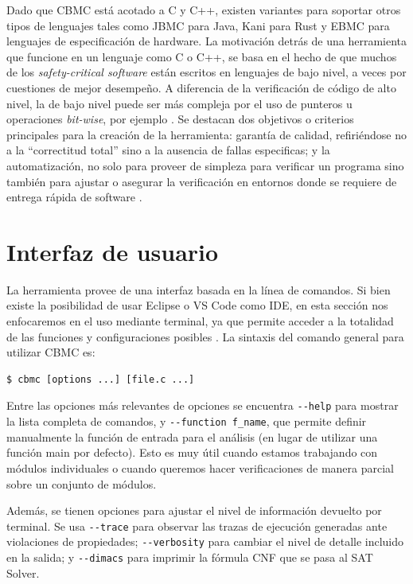 \documentclass[runningheads]{llncs}
\begin{document}
Dado que CBMC está acotado a C y C++, existen variantes para soportar otros tipos de lenguajes tales como JBMC para Java, Kani para Rust y EBMC para 
lenguajes de especificación de hardware.
La motivación detrás de una herramienta que funcione en un lenguaje como C o C++, se basa en el hecho de que muchos de los \textit{safety-critical software} están escritos
en lenguajes de bajo nivel, a veces por cuestiones de mejor desempeño.
A diferencia de la verificación de código de alto nivel, la de bajo nivel puede ser más compleja por el uso de punteros u operaciones \textit{bit-wise}, por ejemplo \cite{tacas-2004}.
Se destacan dos objetivos o criterios principales para la creación de la herramienta: garantía de calidad, refiriéndose no a la “correctitud total” 
sino a la ausencia de fallas especificas; y la automatización, no solo para proveer de simpleza para verificar un programa sino también para ajustar o asegurar 
la verificación en entornos donde se requiere de entrega rápida de software \cite{tacas-2004}.

%
\section{Interfaz de usuario}
La herramienta provee de una interfaz basada en la línea de comandos.
Si bien existe la posibilidad de usar Eclipse o VS Code como IDE, en esta sección nos enfocaremos en el uso mediante terminal, ya que permite acceder a la
totalidad de las funciones y configuraciones posibles \cite{cprover-manual}.
La sintaxis del comando general para utilizar CBMC es:
\begin{verbatim}
$ cbmc [options ...] [file.c ...]
\end{verbatim}

Entre las opciones más relevantes de opciones se encuentra \verb|--help| para mostrar la lista completa de comandos, y \verb|--function f_name|, que permite definir
manualmente la función de entrada para el análisis (en lugar de utilizar una función main por defecto).
Esto es muy útil cuando estamos trabajando con módulos individuales o cuando queremos hacer verificaciones de manera parcial sobre un conjunto de módulos.

Además, se tienen opciones para ajustar el nivel de información devuelto por terminal.
Se usa \verb|--trace| para observar las trazas de ejecución generadas ante violaciones de propiedades; \verb|--verbosity| para cambiar el nivel de detalle incluido en la salida;
y \verb|--dimacs| para imprimir la fórmula CNF que se pasa al SAT Solver.
\end{document}
